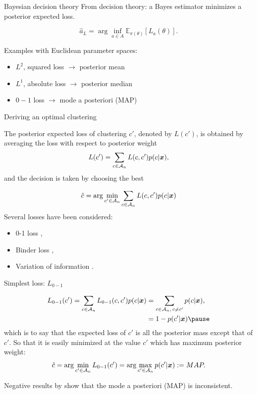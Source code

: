 \begin{frame}{Bayesian decision theory}
	From decision theory: a Bayes estimator minimizes a posterior expected loss.
	
\begin{equation*}
\hat{a}_L = \arg \inf_{a \in A} \mathbb{E}_{\pi(\theta)}[L_a(\theta)].
\end{equation*}\pause

Examples with Euclidean parameter spaces:
\begin{itemize}
	\item $L^2$, squared loss $\longrightarrow$ posterior mean
	\item $L^1$, absolute loss $\longrightarrow$ posterior median
	\item $0-1$ loss  $\longrightarrow$ mode a posteriori (MAP)
\end{itemize}
\end{frame}

\begin{frame}{Deriving an optimal clustering}

The posterior expected loss of clustering $c'$, denoted by $L(c')$, is obtained by \alert{averaging the loss with respect to posterior weight}
$$L(c') = \sum_{c\in\mathcal{A}_n} L(c,c')p(c|\boldsymbol{x}),$$
and the decision is taken by choosing the best

\begin{equation*}
\hat c = \arg \min_{c' \in \mathcal{A}_n} \sum_{c\in\mathcal{A}_n} L(c,c')p(c|\boldsymbol{x})
\end{equation*}\pause
Several losses have been considered:
	\begin{itemize}
		\item 0-1 loss \citep{rajkowski2019analysis},
		\item Binder loss \citep{dahl2006model},
		\item Variation of information \citep{wade2018bayesian}.
	\end{itemize}
\end{frame}

\begin{frame}{Simplest loss: $L_{0-1}$}

\begin{align*}
	L_{0-1}(c') = \sum_{c\in\Ac_n} L_{0-1}(c,c')p(c|\bx) &= \sum_{c\in\Ac_n,\,c\neq c'} p(c|\bx),\\
	& = 1 - p(c'|\bx)\pause
\end{align*}
which is to say that the expected loss of $c'$ is \alert{all the posterior mass except that of $c'$.} So that it is easily minimized at the value $c'$ which has \alert{maximum} posterior weight:
$$\hat c =  \arg \min_{c' \in \mathcal{A}_n} L_{0-1}(c') =   \arg \max_{c' \in \mathcal{A}_n} p(c'|\boldsymbol{x}):= MAP.$$\pause

Negative results by \citet{rajkowski2019analysis} show that the \alert{mode a posteriori (MAP) is inconsistent}.
	
\end{frame}

